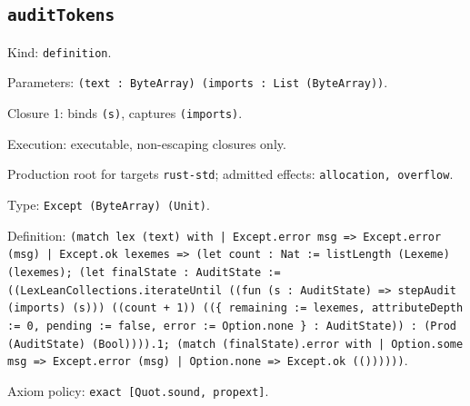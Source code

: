 \documentclass[11pt]{article}
\begin{document}
\subsection*{\texttt{auditTokens}}
\noindent Kind: \texttt{definition}.\par
\noindent Parameters: \texttt{(text : ByteArray) (imports : List (ByteArray))}.\par
\noindent Closure 1: binds \texttt{(s)}, captures \texttt{(imports)}.\par
\noindent Execution: executable, non-escaping closures only.\par
\noindent Production root for targets \texttt{rust-std}; admitted effects: \texttt{allocation, overflow}.\par
\noindent Type: \texttt{Except (ByteArray) (Unit)}.\par
\noindent Definition: \texttt{(match lex (text) with | Except.error msg => Except.error (msg) | Except.ok lexemes => (let count : Nat := listLength (Lexeme) (lexemes); (let finalState : AuditState := ((LexLeanCollections.iterateUntil ((fun (s : AuditState) => stepAudit (imports) (s))) ((count + 1)) ((\{ remaining := lexemes, attributeDepth := 0, pending := false, error := Option.none \} : AuditState)) : (Prod (AuditState) (Bool)))).1; (match (finalState).error with | Option.some msg => Except.error (msg) | Option.none => Except.ok (())))))}.\par
\noindent Axiom policy: \texttt{exact [Quot.sound, propext]}.\par
\end{document}

